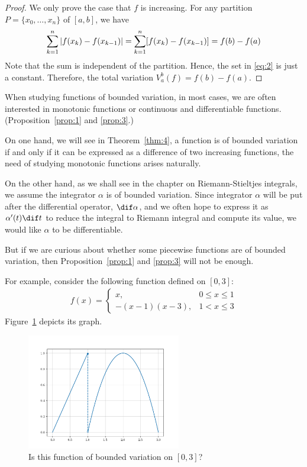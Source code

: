 \documentclass[thmcnt=section, color=blue, 12pt]{my-elegantbook}
\begin{document}
\begin{proof}
	We only prove the case that $f$ is increasing.
	For any partition $P = \{x_0, \dots, x_n\}$ of $[a, b]$, we have
	\begin{align*}
		\sum_{k=1}^n \left\lvert f(x_k) - f(x_{k-1}) \right\rvert
		= \sum_{k=1}^n [f(x_k) - f(x_{k-1})]
		= f(b) - f(a)
	\end{align*}
	Note that the sum is independent of the partition.
	Hence, the set in \eqref{eq:2} is just a constant.
	Therefore, the total variation $V_a^b(f) = f(b) - f(a)$.
\end{proof}

When studying functions of bounded variation,
in most cases, we are often interested in
monotonic functions
or continuous and differentiable functions.
(Proposition~\ref{prop:1} and \ref{prop:3}.)

\begin{note}
	On one hand, we will see in Theorem~\ref{thm:4},
	a function is of bounded variation if and only if
	it can be expressed as a difference
	of two increasing functions,
	the need of studying monotonic functions arises naturally.

	On the other hand, as we shall see in the chapter on Riemann-Stieltjes integrals,
	we assume the integrator $\alpha$ is of bounded variation.
	Since integrator $\alpha$ will be put after the
	differential operator, $\dif \alpha$,
	and we often hope to express it as $\alpha^\prime(t) \dif t$
	to reduce the integral to Riemann integral
	and compute its value,
	we would like $\alpha$ to be differentiable.
\end{note}

But if we are curious about whether some piecewise functions
are of bounded variation,
then Proposition~\ref{prop:1} and \ref{prop:3} will not be enough.

For example, consider the following function defined on $[0, 3]$:
\begin{align*}
	f(x) = \begin{cases}
		       x,           & 0 \leq x \leq 1 \\
		       -(x-1)(x-3), & 1 < x \leq 3
	       \end{cases}
\end{align*}
Figure~\ref{fig:4} depicts its graph.
\begin{figure}[H]
	\centering
	\includegraphics[width=0.6\textwidth]{figures/piecewise-function-of-bounded-variation.png}
	\caption{Is this function of bounded variation on $[0, 3]$?}
	\label{fig:4}
\end{figure}
\end{document}
